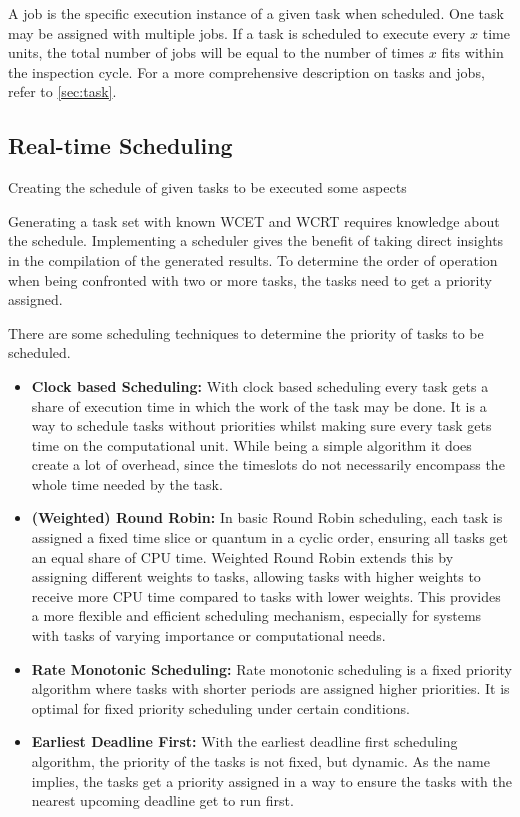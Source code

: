 A job is the specific execution instance of a given task when scheduled.
One task may be assigned with multiple jobs.
If a task is scheduled to execute every $x$ time units, the total number of jobs will be equal to the number of times $x$ fits within the inspection cycle.
For a more comprehensive description on tasks and jobs, refer to \cref{sec:task}.

\subsection{Real-time Scheduling}\label{sec:scheduling}
Creating the schedule of given tasks to be executed some aspects


Generating a task set with known \ac{WCET} and \ac{WCRT} requires knowledge about the schedule.
Implementing a scheduler gives the benefit of taking direct insights in the compilation of the generated results. 
To determine the order of operation when being confronted with two or more tasks, the tasks need to get a priority assigned.

There are some scheduling techniques to determine the priority of tasks to be scheduled.
\begin{itemize}
	\item \textbf{Clock based Scheduling:}
	      With clock based scheduling every task gets a share of execution time in which the work of the task may be done.
	      It is a way to schedule tasks without priorities whilst making sure every task gets time on the computational unit.
	      While being a simple algorithm it does create a lot of overhead, since the timeslots do not necessarily encompass the whole time needed by the task.
	\item \textbf{(Weighted) Round Robin:}
	      In basic Round Robin scheduling, each task is assigned a fixed time slice or quantum in a cyclic order, ensuring all tasks get an equal share of CPU time. Weighted Round Robin extends this by assigning different weights to tasks, allowing tasks with higher weights to receive more CPU time compared to tasks with lower weights. This provides a more flexible and efficient scheduling mechanism, especially for systems with tasks of varying importance or computational needs. \cite{helmyOptimizingRoundRobinScheduling2024}
	\item \textbf{Rate Monotonic Scheduling:} Rate monotonic scheduling is a fixed priority algorithm where tasks with shorter periods are assigned higher priorities. It is optimal for fixed priority scheduling under certain conditions. \cite{lehoczkyRateMonotonicScheduling1989}
	\item \textbf{Earliest Deadline First:} With the earliest deadline first scheduling algorithm, the priority of the tasks is not fixed, but dynamic. As the name implies, the tasks get a priority assigned in a way to ensure the tasks with the nearest upcoming deadline get to run first. \cite{lehoczkyPerformanceRealtimeBus1986}
\end{itemize}

